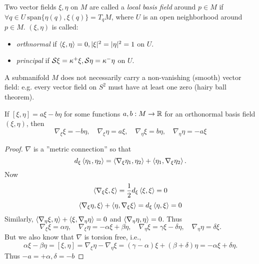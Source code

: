 \begin{definition}
	
	Two vector fields $ \xi,\eta $ on $ M $ are called a \emph{local basis field} around $ p \in M $ if $ \forall q \in U ~ \mathrm{span}\{ \eta(q), \xi(q) \} = T_qM$, where $ U $ is an open neighborhood around $ p \in M $.
	$ (\xi,\eta) $ is called:
	\begin{itemize}
		\item \emph{orthnormal} if $ \left \langle \xi,\eta \right\rangle = 0, |\xi|^2 = |\eta|^2 = 1 $ on $ U $.
		\item \emph{principal} if $ \mathcal S\xi = \kappa^+\xi, \mathcal S\eta = \kappa^-\eta $ on $ U $.
	\end{itemize} 
	
\end{definition}

\begin{remark}
	
	A submanifold $ M $ does not necessarily carry a non-vanishing (smooth) vector field: e.g. every vector field on $ S^2 $ must have at least one zero (hairy ball theorem).
	
\end{remark}

\begin{lemma}
	If $ [\xi,\eta]=a\xi - b\eta $ for some functions $ a,b:M \rightarrow \mathbb R $ for an orthonormal basis field $ (\xi,\eta) $, then
		\[ \nabla_\xi \xi = - b \eta, \quad \nabla_\xi \eta = a\xi, \quad \nabla_\eta \xi =  b\eta, \quad \nabla_\eta \eta = - a\xi \]
\end{lemma}

\begin{proof}
	
	$ \nabla $ is a ''metric connection'' so that 
		\[ d_\xi\left \langle \eta_1,\eta_2 \right\rangle = \left \langle \nabla_\xi \eta_1,\eta_2 \right\rangle +\left \langle \eta_1,\nabla_\xi \eta_2 \right\rangle. \]
	Now 
		\[\left \langle \nabla_\xi \xi,\xi \right\rangle = \dfrac{1}{2} d_\xi\left \langle \xi,\xi \right\rangle = 0 \]
		\[\left \langle \nabla_\xi \eta,\xi \right\rangle + \left \langle \eta,\nabla_\xi \xi \right\rangle = d_\xi\left \langle \eta,\xi \right\rangle = 0 \]
	Similarly, $ \left \langle \nabla_\eta \xi,\eta \right\rangle + \left \langle \xi,\nabla_\eta \eta \right\rangle = 0  $ and $ \left \langle \nabla_\eta \eta,\eta \right\rangle = 0 $.
	Thus 
		\[ \nabla_\xi \xi = \alpha \eta, \quad \nabla_\xi \eta = -\alpha \xi + \beta \eta, \quad \nabla_\eta \xi =  \gamma\xi - \delta \eta, \quad \nabla_\eta \eta = \delta \xi. \]
	But we also know that $ \nabla $ is torsion free, i.e.,
		\[ \alpha \xi - \beta \eta  = [\xi,\eta] = \nabla_\xi \eta - \nabla_\eta \xi = (\gamma - \alpha)\xi + (\beta + \delta)\eta = - \alpha \xi + \delta \eta. \]
	Thus $ -a = +  \alpha, \delta = -b $
		 	
\end{proof}

